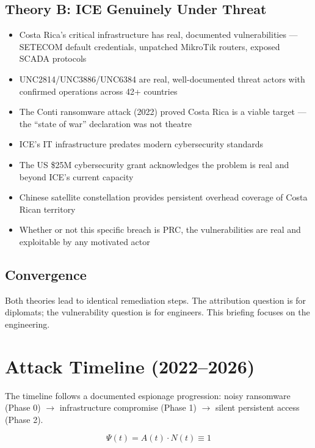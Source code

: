\documentclass[11pt,a4paper]{article}
\begin{document}
\subsection{Theory B: ICE Genuinely Under Threat}

\begin{itemize}[leftmargin=1.5em]
  \item Costa Rica's critical infrastructure has real, documented vulnerabilities — SETECOM default credentials, unpatched MikroTik routers, exposed SCADA protocols
  \item UNC2814/UNC3886/UNC6384 are real, well-documented threat actors with confirmed operations across 42+ countries
  \item The Conti ransomware attack (2022) proved Costa Rica is a viable target — the ``state of war'' declaration was not theatre
  \item ICE's IT infrastructure predates modern cybersecurity standards
  \item The US \$25M cybersecurity grant acknowledges the problem is real and beyond ICE's current capacity
  \item Chinese satellite constellation provides persistent overhead coverage of Costa Rican territory
  \item Whether or not this specific breach is PRC, the vulnerabilities are real and exploitable by any motivated actor
\end{itemize}

\subsection{Convergence}

Both theories lead to identical remediation steps. The attribution question is for diplomats; the vulnerability question is for engineers. This briefing focuses on the engineering.

\section{Attack Timeline (2022--2026)}

The timeline follows a documented espionage progression: noisy ransomware (Phase 0) $\rightarrow$ infrastructure compromise (Phase 1) $\rightarrow$ silent persistent access (Phase 2).

\begin{equation}
\Psi(t) = A(t) \cdot N(t) \equiv 1
\end{equation}
\end{document}
